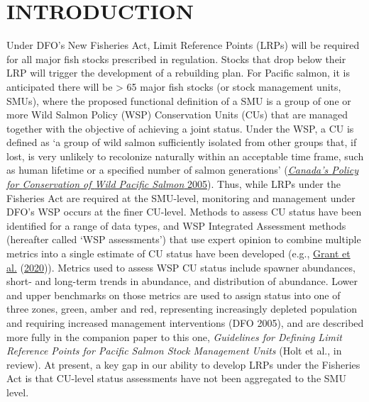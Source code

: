 \documentclass[11pt]{book}
\begin{document}
\frontmatter

\hypertarget{introduction}{%
\section{INTRODUCTION}\label{introduction}}

Under DFO's New Fisheries Act, Limit Reference Points (LRPs) will be required for all major fish stocks prescribed in regulation. Stocks that drop below their LRP will trigger the development of a rebuilding plan. For Pacific salmon, it is anticipated there will be \textgreater{} 65 major fish stocks (or stock management units, SMUs), where the proposed functional definition of a SMU is a group of one or more Wild Salmon Policy (WSP) Conservation Units (CUs) that are managed together with the objective of achieving a joint status. Under the WSP, a CU is defined as `a group of wild salmon sufficiently isolated from other groups that, if lost, is very unlikely to recolonize naturally within an acceptable time frame, such as human lifetime or a specified number of salmon generations' (\protect\hyperlink{ref-dfoCanadaPolicyConservation2005}{\emph{Canada's {Policy} for {Conservation} of {Wild Pacific Salmon}} 2005}). Thus, while LRPs under the Fisheries Act are required at the SMU-level, monitoring and management under DFO's WSP occurs at the finer CU-level. Methods to assess CU status have been identified for a range of data types, and WSP Integrated Assessment methods (hereafter called `WSP assessments') that use expert opinion to combine multiple metrics into a single estimate of CU status have been developed (e.g., \protect\hyperlink{ref-grant2017FraserSockeye2020}{Grant et al.} (\protect\hyperlink{ref-grant2017FraserSockeye2020}{2020})). Metrics used to assess WSP CU status include spawner abundances, short- and long-term trends in abundance, and distribution of abundance. Lower and upper benchmarks on those metrics are used to assign status into one of three zones, green, amber and red, representing increasingly depleted population and requiring increased management interventions (DFO 2005), and are described more fully in the companion paper to this one, \emph{Guidelines for Defining Limit Reference Points for Pacific Salmon Stock Management Units} (Holt et al., in review). At present, a key gap in our ability to develop LRPs under the Fisheries Act is that CU-level status assessments have not been aggregated to the SMU level.
\end{document}
